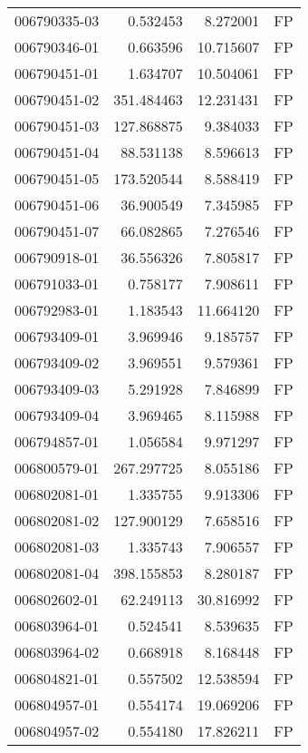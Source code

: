 \begin{tabular}{lrrl}
006790335-03 &    0.532453 &       8.272001 &   FP \\
006790346-01 &    0.663596 &      10.715607 &   FP \\
006790451-01 &    1.634707 &      10.504061 &   FP \\
006790451-02 &  351.484463 &      12.231431 &   FP \\
006790451-03 &  127.868875 &       9.384033 &   FP \\
006790451-04 &   88.531138 &       8.596613 &   FP \\
006790451-05 &  173.520544 &       8.588419 &   FP \\
006790451-06 &   36.900549 &       7.345985 &   FP \\
006790451-07 &   66.082865 &       7.276546 &   FP \\
006790918-01 &   36.556326 &       7.805817 &   FP \\
006791033-01 &    0.758177 &       7.908611 &   FP \\
006792983-01 &    1.183543 &      11.664120 &   FP \\
006793409-01 &    3.969946 &       9.185757 &   FP \\
006793409-02 &    3.969551 &       9.579361 &   FP \\
006793409-03 &    5.291928 &       7.846899 &   FP \\
006793409-04 &    3.969465 &       8.115988 &   FP \\
006794857-01 &    1.056584 &       9.971297 &   FP \\
006800579-01 &  267.297725 &       8.055186 &   FP \\
006802081-01 &    1.335755 &       9.913306 &   FP \\
006802081-02 &  127.900129 &       7.658516 &   FP \\
006802081-03 &    1.335743 &       7.906557 &   FP \\
006802081-04 &  398.155853 &       8.280187 &   FP \\
006802602-01 &   62.249113 &      30.816992 &   FP \\
006803964-01 &    0.524541 &       8.539635 &   FP \\
006803964-02 &    0.668918 &       8.168448 &   FP \\
006804821-01 &    0.557502 &      12.538594 &   FP \\
006804957-01 &    0.554174 &      19.069206 &   FP \\
006804957-02 &    0.554180 &      17.826211 &   FP \\

\end{tabular}
